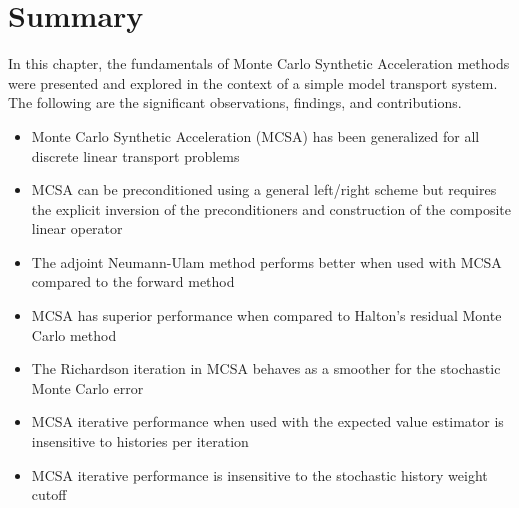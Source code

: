 \clearpage

\section{Summary}
\label{sec:mc_summary}

In this chapter, the fundamentals of Monte Carlo Synthetic
Acceleration methods were presented and explored in the context of a
simple model transport system. The following are the significant
observations, findings, and contributions.

\begin{itemize}
\item Monte Carlo Synthetic Acceleration (MCSA) has been generalized
  for all discrete linear transport problems
\item MCSA can be preconditioned using a general left/right scheme but
  requires the explicit inversion of the preconditioners and
  construction of the composite linear operator
\item The adjoint Neumann-Ulam method performs better when used with
  MCSA compared to the forward method
\item MCSA has superior performance when compared to Halton's residual
  Monte Carlo method
\item The Richardson iteration in MCSA behaves as a smoother for the
  stochastic Monte Carlo error
\item MCSA iterative performance when used with the expected value
  estimator is insensitive to histories per iteration
\item MCSA iterative performance is insensitive to the stochastic
  history weight cutoff
\end{itemize}
